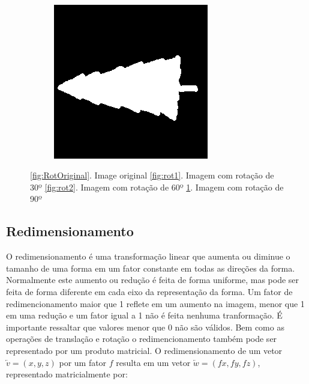 \documentclass[
	article,			%
	11pt,				%
	oneside,			%
	a4paper,			%
	english,			%
	brazil,				%
	sumario=tradicional
	]{abntex2}
\begin{document}
\begin{figure}
\begin{subfigure}[b]{0.3\textwidth}
        \end{subfigure}
        ~
        \begin{subfigure}[b]{0.3\textwidth}
                \includegraphics[width=\textwidth]{imagens/ex1/image90.png}
                \caption{}
                \label{fig:rot3}       
        \end{subfigure}
        \caption{ \ref{fig:RotOriginal}. Image original
        \ref{fig:rot1}. Imagem com rotação de 30º
        \ref{fig:rot2}. Imagem com rotação de 60º
        \ref{fig:rot3}. Imagem com rotação de 90º
        }
        \label{fig:rotacao}
\end{figure}


\subsection{Redimensionamento}
O redimensionamento é uma transformação linear que aumenta ou diminue o tamanho
de uma forma em um fator constante em todas as direções da forma. Normalmente
este aumento ou redução é feita de forma uniforme, mas pode ser feita de forma
diferente em cada eixo da representação da forma. Um fator de redimencionamento
maior que 1 reflete em um aumento na imagem, menor que 1 em uma redução e um
fator igual a 1 não é feita nenhuma tranformação. É importante ressaltar que
valores menor que 0 não são válidos.
Bem como as operações de translação e rotação o redimencionamento também pode
ser representado por um produto matricial. O redimensionamento de um vetor
$\overleftarrow{v}=(x,y,z)$ por um fator $f$ resulta em um vetor
$\overleftarrow{w}=(fx,fy,fz)$, representado matricialmente por:
\end{document}
